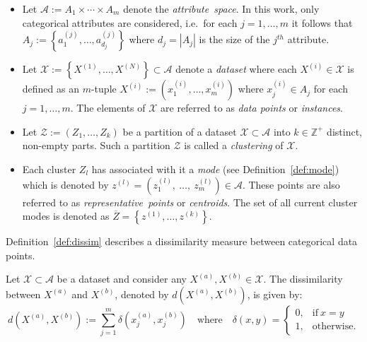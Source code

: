 \begin{itemize}
    \item Let \(\mathcal{A} := A_1 \times \cdots \times A_m\) denote the
        \emph{attribute~space}. In this work, only categorical attributes are
        considered, i.e.\ for each \(j = 1, \ldots, m\) it follows that \(A_j :=
        \left\{a_1^{(j)}, \ldots, a_{d_j}^{(j)}\right\}\) where \(d_j = |A_j|\)
        is the size of the \(j^{th}\) attribute.

    \item Let \(\mathcal{X} := \left\{X^{(1)}, \ldots, X^{(N)}\right\} \subset
        \mathcal{A}\) denote a \emph{dataset} where each \(X^{(i)} \in
        \mathcal{X}\) is defined as an \(m\)-tuple \(X^{(i)} := \left(x_1^{(i)},
        \ldots, x_m^{(i)}\right)\) where \(x_j^{(i)} \in A_j\) for each \(j = 1,
        \ldots, m\). The elements of \(\mathcal{X}\) are referred to as
        \emph{data points} or \emph{instances}.
    \item Let \(\mathcal{Z} := \left(Z_1, \ldots, Z_k\right)\) be a partition
        of a dataset \(\mathcal{X} \subset \mathcal A\) into \(k \in
        \mathbb{Z}^{+}\) distinct, non-empty parts. Such a partition
        \(\mathcal{Z}\) is called a \emph{clustering} of \(\mathcal{X}\).

    \item Each cluster \(Z_l\) has associated with it a
        \emph{mode} (see Definition~\ref{def:mode}) which is
        denoted by \(z^{(l)} = \left(z_1^{(l)},~\ldots,~z_m^{(l)}\right) \in
        \mathcal{A}\).  These points are also referred to as
        \emph{representative~points} or \emph{centroids}. The set of all current
        cluster modes is denoted as \(\overline Z = \left\{z^{(1)}, \ldots,
        z^{(k)}\right\}\).
\end{itemize}

Definition~\ref{def:dissim} describes a dissimilarity measure between
categorical data points.

\begin{definition}\label{def:dissim}
    Let \(\mathcal{X} \subset \mathcal A\) be a dataset and consider any
    \(X^{(a)}, X^{(b)} \in \mathcal{X}\). The dissimilarity between \(X^{(a)}\)
    and \(X^{(b)}\), denoted by \(d\left(X^{(a)}, X^{(b)}\right)\), is given by:
    \begin{equation}\label{eq:dissim}
        d\left(X^{(a)}, X^{(b)}\right) := \sum_{j=1}^{m} \delta\left(x_j^{(a)},
        x_j^{(b)}\right) \quad \text{where} \quad \delta\left(x, y\right) =
        \begin{cases}
            0, & \text{if} \ x = y \\
            1, & \text{otherwise.}
        \end{cases}
    \end{equation}
\end{definition}

